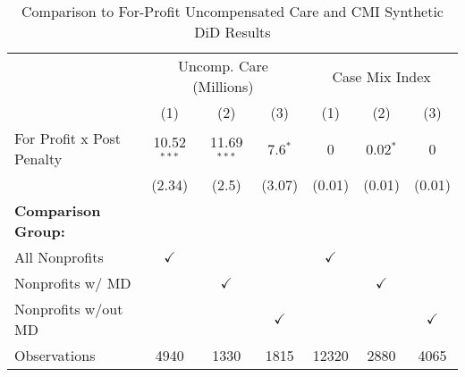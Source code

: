 \begin{table}[ht!]

\caption{\label{tab:forprofit_uncompCMI_synth} Comparison to For-Profit Uncompensated Care and CMI Synthetic DiD Results}
\centering
\begin{tabular}[t]{lcccccc}
\toprule
\multicolumn{1}{c}{ } & \multicolumn{3}{c}{Uncomp. Care (Millions)} & \multicolumn{3}{c}{Case Mix Index} \\
\cmidrule(l{3pt}r{3pt}){2-4} \cmidrule(l{3pt}r{3pt}){5-7}
 & (1) & (2) & (3) & (1) & (2) & (3)\\
\midrule
For Profit x Post Penalty & 10.52$^{***}$ & 11.69$^{***}$ & 7.6$^{*}$ & 0 & 0.02$^{*}$ & 0\\
 & (2.34) & (2.5) & (3.07) & (0.01) & (0.01) & (0.01)\\
\textbf{Comparison Group:} &  &  &  &  &  & \\
All Nonprofits & $\checkmark$ &  &  & $\checkmark$ &  & \\
Nonprofits w/ MD &  & $\checkmark$ &  &  & $\checkmark$ & \\
\addlinespace
Nonprofits w/out MD &  &  & $\checkmark$ &  &  & $\checkmark$\\
Observations & 4940 & 1330 & 1815 & 12320 & 2880 & 4065\\
\bottomrule
\end{tabular}
\end{table}

